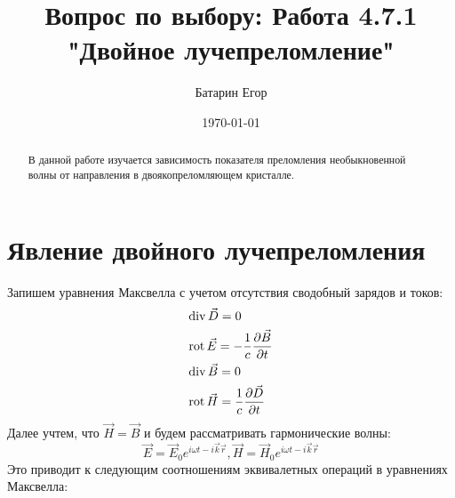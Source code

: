 \documentclass[a4paper,12pt]{article}
\author{Батарин Егор}
\title{Вопрос по выбору: Работа 4.7.1 "Двойное лучепреломление"}
\date{\today}
\begin{document}
 
\maketitle

\begin{abstract}
	В данной работе изучается зависимость показателя преломления необыкновенной волны от направления в двоякопреломляющем кристалле.
\end{abstract}

\section{Явление двойного лучепреломления}
Запишем уравнения Максвелла с учетом отсутствия сводобный зарядов и токов: 
\[\begin{gathered}
\operatorname{div}\vec D = 0 \hfill \\
\operatorname{rot}\vec E =  - \frac{1}{c}\frac{{\partial \vec B}}{{\partial t}} \hfill \\
\operatorname{div}\vec B = 0 \hfill \\
\operatorname{rot}\vec H = \frac{1}{c}\frac{{\partial \vec D}}{{\partial t}} \hfill \\ 
\end{gathered} \]
Далее учтем, что $\vec H = \vec B$ и будем рассматривать гармонические волны: 
$$\vec E = {{\vec E}_0}{e^{i\omega t - i\vec k\vec r}},\vec H = {{\vec H}_0}{e^{i\omega t - i\vec k\vec r}}$$
Это приводит к следующим соотношениям эквивалетных операций в уравнениях Максвелла:
\end{document}
